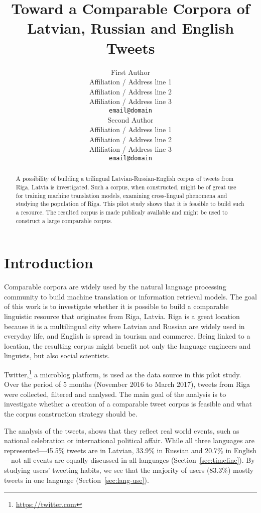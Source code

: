\documentclass[11pt,a4paper]{article}
\title{Toward a Comparable Corpora of Latvian, Russian and English Tweets}
\author{First Author \\
  Affiliation / Address line 1 \\
  Affiliation / Address line 2 \\
  Affiliation / Address line 3 \\
  {\tt email@domain} \\\And
  Second Author \\
  Affiliation / Address line 1 \\
  Affiliation / Address line 2 \\
  Affiliation / Address line 3 \\
  {\tt email@domain} \\}
\date{}
\begin{document}
\maketitle

\begin{abstract} 
A possibility of building a trilingual Latvian-Russian-English corpus of tweets from Riga, Latvia is investigated. Such a corpus, when constructed, might be of great use for training machine translation models, examining cross-lingual phenomena and studying the population of Riga. This pilot study shows that it is feasible to build such a resource. The resulted corpus is made publicaly available and might be used to construct a large comparable corpus.
\end{abstract}

\section{Introduction}
\label{sec:introduction}

Comparable corpora are widely used by the natural language processing community to build machine translation or information retrieval models. The goal of this work is to investigate whether it is possible to build a comparable linguistic resource that originates from Riga, Latvia. Riga is a great location because it is a multilingual city where Latvian and Russian are widely used in everyday life, and English is spread in tourism and commerce. Being linked to a location, the resulting corpus might benefit not only the language engineers and linguists, but also social scientists.

Twitter,\footnote{\url{https://twitter.com}} a microblog platform, is used as the data source in this pilot study. Over the period of 5 months (November 2016 to March 2017), tweets from Riga were collected, filtered and analysed. The main goal of the analysis is to investigate whether a creation of a comparable tweet corpus is feasible and what the corpus construction strategy should be.

The analysis of the tweets, shows that they reflect real world events, such as national celebration or international political affair. While all three languages are represented---45.5\% tweets are in Latvian, 33.9\% in Russian and 20.7\% in English---not all events are equally discussed in all languages (Section~\ref{sec:timeline}). By studying users' tweeting habits, we see that the majority of users (83.3\%) mostly tweets in one language (Section~\ref{sec:lang-use}).
\end{document}
